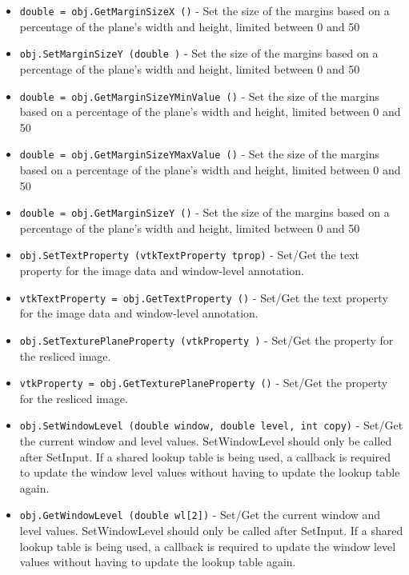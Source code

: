 \begin{itemize}
\item  \verb|double = obj.GetMarginSizeX ()| -  Set the size of the margins based on a percentage of the
 plane's width and height, limited between 0 and 50%

\item  \verb|obj.SetMarginSizeY (double )| -  Set the size of the margins based on a percentage of the
 plane's width and height, limited between 0 and 50%

\item  \verb|double = obj.GetMarginSizeYMinValue ()| -  Set the size of the margins based on a percentage of the
 plane's width and height, limited between 0 and 50%

\item  \verb|double = obj.GetMarginSizeYMaxValue ()| -  Set the size of the margins based on a percentage of the
 plane's width and height, limited between 0 and 50%

\item  \verb|double = obj.GetMarginSizeY ()| -  Set the size of the margins based on a percentage of the
 plane's width and height, limited between 0 and 50%

\item  \verb|obj.SetTextProperty (vtkTextProperty tprop)| -  Set/Get the text property for the image data and window-level annotation.

\item  \verb|vtkTextProperty = obj.GetTextProperty ()| -  Set/Get the text property for the image data and window-level annotation.

\item  \verb|obj.SetTexturePlaneProperty (vtkProperty )| -  Set/Get the property for the resliced image.

\item  \verb|vtkProperty = obj.GetTexturePlaneProperty ()| -  Set/Get the property for the resliced image.

\item  \verb|obj.SetWindowLevel (double window, double level, int copy)| -  Set/Get the current window and level values.  SetWindowLevel should
 only be called after SetInput.  If a shared lookup table is being used,
 a callback is required to update the window level values without having
 to update the lookup table again.

\item  \verb|obj.GetWindowLevel (double wl[2])| -  Set/Get the current window and level values.  SetWindowLevel should
 only be called after SetInput.  If a shared lookup table is being used,
 a callback is required to update the window level values without having
 to update the lookup table again.


\end{itemize}
